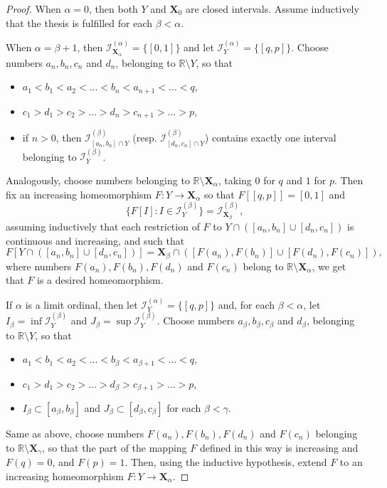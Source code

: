 \documentclass[12pt,a4paper,leqno]{amsart}
\theoremstyle{definition}
\begin{document}
\begin{proof} When $\alpha =0 $, then  both $Y$ and $\textbf{X}_0$ are closed intervals. Assume inductively that the thesis is fulfilled for each $\beta <\alpha$.

When $\alpha = \beta+1$, then $\mathcal I^{(\alpha)}_{\textbf{X}_\alpha} = \{[0,1]\}$ and let $\mathcal I^{(\alpha)}_{Y} = \{[q,p]\}$. Choose numbers $a_n,b_n, c_n$ and $d_n$,  belonging to $\mathbb R\setminus Y$, so that 
  \begin{itemize}
	\item $a_1 < b_1 < a_2 < \ldots < b_n < a_{n+1} < \ldots < q$, 
	\item $c_1 > d_1 > c_2 > \ldots > d_n > c_{n+1} > \ldots > p$,
	\item if $n>0$, then $\mathcal I^{(\beta)}_{[a_n,b_n]\cap Y}$ (resp. $\mathcal I^{(\beta)}_{[d_n,c_n]\cap Y}$) contains  exactly one interval belonging to $\mathcal I^{(\beta)}_{Y}$.
  \end{itemize} 
	Analogously,  choose numbers belonging to $\mathbb R \setminus \textbf{X}_\alpha$, taking $0$ for $q$ and $1$ for $p$. Then fix an increasing homeomorphism $F\colon Y \to \textbf{X}_\alpha $ so that
$F[[q, p]] =[0,1]$ and  $$\{ F[I]\colon I \in \mathcal I^{(\beta)}_Y \} = \mathcal I^{(\beta)}_{\textbf{X}_\beta},$$
assuming inductively that each  restriction of $F$ to $Y\cap ([a_n, b_n] \cup [d_n, c_n]) $ is  continuous and increasing, and such that 
$$F[ Y\cap ( [a_n, b_n] \cup [d_n, c_n]) ] = \textbf{X}_\beta \cap ([F(a_n), F(b_n)] \cup [F(d_n), F(c_n)]),$$ where numbers $F(a_n), F(b_n), F(d_n)$ and $F(c_n)$ belong to $\mathbb R \setminus \textbf{X}_\alpha$,  we get that $F$ is a desired homeomorphism.

If $\alpha$ is a  limit ordinal, then let     $\mathcal I^{(\alpha)}_{Y} = \{[q,p]\}$ and, for each $\beta < \alpha$, let $ I_\beta= \inf \mathcal I^{(\beta)}_Y$ and $ J_\beta= \sup \mathcal I^{(\beta)}_Y$. Choose numbers $a_\beta,b_\beta, c_\beta$ and $d_\beta$,  belonging to $\mathbb R\setminus Y$, so that 
  \begin{itemize}
	\item[] $a_1 < b_1 < a_2 < \ldots < b_\beta < a_{\beta+1} < \ldots < q$, 
	\item[] $c_1 > d_1 > c_2 > \ldots > d_\beta > c_{\beta+1} > \ldots > p$, 
	\item[]  $ I_\beta \subset [a_\beta, b_\beta]$ and  $ J_\beta \subset [d_\beta, c_\beta]$ for each $\beta < \gamma$.   \end{itemize}
Same as above,  choose numbers $F(a_n), F(b_n), F(d_n)$ and $F(c_n)$ belonging to $\mathbb R \setminus \textbf{X}_\gamma$, so that the part of the mapping $F$ defined in this way is increasing and  $F(q)=0$, and  $F(p)=1$. Then, using the inductive hypothesis,  extend $F$ to an increasing homeomorphism $F\colon Y \to \textbf{X}_\alpha$. \end{proof}
\end{document}
